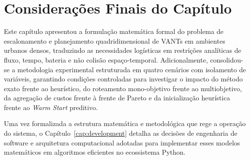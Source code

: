 \section{Considerações Finais do Capítulo}\label{sec:conclusao_cap3}

Este capítulo apresentou a formulação matemática formal do problema de escalonamento e planejamento quadridimensional de VANTs em ambientes urbanos densos, traduzindo as necessidades logísticas em restrições analíticas de fluxo, tempo, bateria e não colisão espaço-temporal. Adicionalmente, consolidou-se a metodologia experimental estruturada em quatro cenários com isolamento de variáveis, garantindo condições controladas para investigar o impacto do método exato frente ao heurístico, do roteamento mono-objetivo frente ao multiobjetivo, da agregação de custos frente à frente de Pareto e da inicialização heurística frente ao \textit{Warm Start} preditivo.

Uma vez formalizada a estrutura matemática e metodológica que rege a operação do sistema, o Capítulo~\ref{cap:development} detalha as decisões de engenharia de software e arquitetura computacional adotadas para implementar esses modelos matemáticos em algoritmos eficientes no ecossistema Python.
